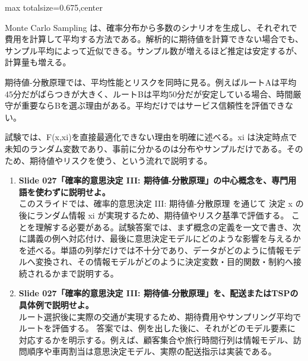 \begin{adjustbox}{max totalsize={\textwidth}{0.675\textheight},center}
\begin{minipage}{\textwidth}
\begin{minipage}[t]{0.485\textwidth}
Monte Carlo Sampling は、確率分布から多数のシナリオを生成し、それぞれで費用を計算して平均する方法である。解析的に期待値を計算できない場合でも、サンプル平均によって近似できる。サンプル数が増えるほど推定は安定するが、計算量も増える。\par
期待値-分散原理では、平均性能とリスクを同時に見る。例えばルートAは平均45分だがばらつきが大きく、ルートBは平均50分だが安定している場合、時間厳守が重要ならBを選ぶ理由がある。平均だけではサービス信頼性を評価できない。\par
試験では、F(x,xi)を直接最適化できない理由を明確に述べる。xi は決定時点で未知のランダム変数であり、事前に分かるのは分布やサンプルだけである。そのため、期待値やリスクを使う、という流れで説明する。\par
{}
\begin{enumerate}
\item \textbf{Slide 027「確率的意思決定 III: 期待値-分散原理」の中心概念を、専門用語を使わずに説明せよ。}\\このスライドでは、確率的意思決定 III: 期待値-分散原理 を通じて 決定 x の後にランダム情報 xi が実現するため、期待値やリスク基準で評価する。 ことを理解する必要がある。試験答案では、まず概念の定義を一文で書き、次に講義の例へ対応付け、最後に意思決定モデルにどのような影響を与えるかを述べる。単語の列挙だけでは不十分であり、データがどのように情報モデルへ変換され、その情報モデルがどのように決定変数・目的関数・制約へ接続されるかまで説明する。
\item \textbf{Slide 027「確率的意思決定 III: 期待値-分散原理」を、配送またはTSPの具体例で説明せよ。}\\ルート選択後に実際の交通が実現するため、期待費用やサンプリング平均でルートを評価する。 答案では、例を出した後に、それがどのモデル要素に対応するかを明示する。例えば、顧客集合や旅行時間行列は情報モデル、訪問順序や車両割当は意思決定モデル、実際の配送指示は実装である。
\end{enumerate}
\end{minipage}
\end{minipage}
\end{adjustbox}


